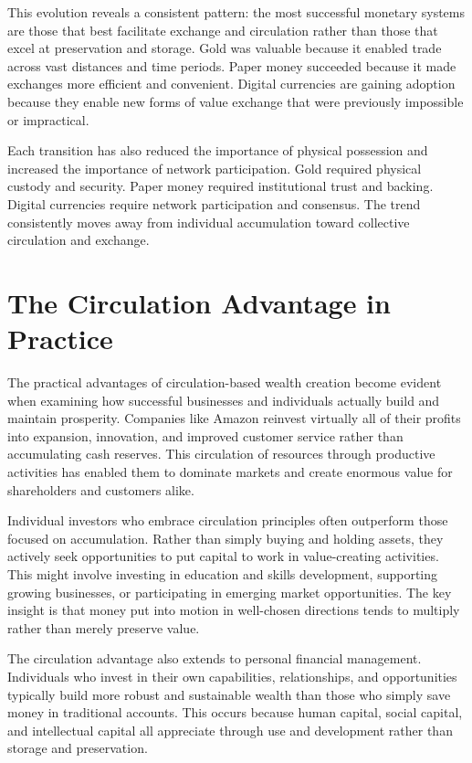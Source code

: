 \documentclass[
  Letterpaper,
]{scrbook}
\begin{document}
This evolution reveals a consistent pattern: the most successful
monetary systems are those that best facilitate exchange and circulation
rather than those that excel at preservation and storage. Gold was
valuable because it enabled trade across vast distances and time
periods. Paper money succeeded because it made exchanges more efficient
and convenient. Digital currencies are gaining adoption because they
enable new forms of value exchange that were previously impossible or
impractical.

Each transition has also reduced the importance of physical possession
and increased the importance of network participation. Gold required
physical custody and security. Paper money required institutional trust
and backing. Digital currencies require network participation and
consensus. The trend consistently moves away from individual
accumulation toward collective circulation and exchange.

\section{The Circulation Advantage in
Practice}\label{the-circulation-advantage-in-practice}

The practical advantages of circulation-based wealth creation become
evident when examining how successful businesses and individuals
actually build and maintain prosperity. Companies like Amazon reinvest
virtually all of their profits into expansion, innovation, and improved
customer service rather than accumulating cash reserves. This
circulation of resources through productive activities has enabled them
to dominate markets and create enormous value for shareholders and
customers alike.

Individual investors who embrace circulation principles often outperform
those focused on accumulation. Rather than simply buying and holding
assets, they actively seek opportunities to put capital to work in
value-creating activities. This might involve investing in education and
skills development, supporting growing businesses, or participating in
emerging market opportunities. The key insight is that money put into
motion in well-chosen directions tends to multiply rather than merely
preserve value.

The circulation advantage also extends to personal financial management.
Individuals who invest in their own capabilities, relationships, and
opportunities typically build more robust and sustainable wealth than
those who simply save money in traditional accounts. This occurs because
human capital, social capital, and intellectual capital all appreciate
through use and development rather than storage and preservation.
\end{document}
